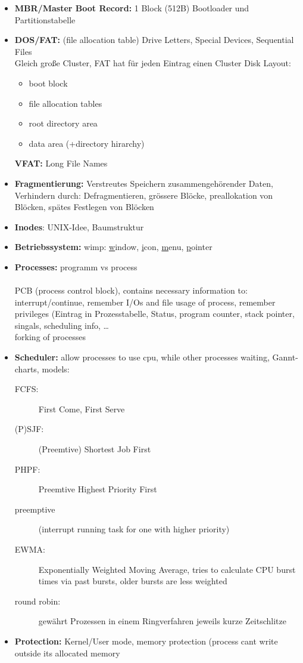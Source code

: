 \begin{itemize}
  \item \textbf{MBR/Master Boot Record:} 1 Block (512B) Bootloader und Partitionstabelle
  \item \textbf{DOS/FAT:} (file allocation table) Drive Letters, Special Devices, Sequential Files \\
  Gleich große Cluster, FAT hat für jeden Eintrag einen Cluster
  Disk Layout:
  \begin{itemize}
  \item boot block
  \item file allocation tables
  \item root directory area
  \item data area (+directory hirarchy)
  \end{itemize}
 \textbf{VFAT:} Long File Names
 \item \textbf{Fragmentierung:} Verstreutes Speichern zusammengehörender Daten, Verhindern durch: Defragmentieren, grössere Blöcke, preallokation von Blöcken, spätes Festlegen von Blöcken
 \item \textbf{Inodes}: UNIX-Idee, Baumstruktur
 \item \textbf{Betriebssystem:} wimp: \underline{w}indow, \underline{i}con, \underline{m}enu, \underline{p}ointer
 \item \textbf{Processes:} programm vs process \\
  \\
 PCB (process control block), contains necessary information to: interrupt/continue, remember I/Os and file usage of process, remember privileges (Eintrag in Prozesstabelle, Status, program counter, stack pointer, singals, scheduling info, \dots\\
 forking of processes
 \item \textbf{Scheduler:} allow processes to use cpu, while other processes waiting, Gannt-charts, models:
  \begin{description}
  \item[FCFS:] First Come, First Serve
  \item[(P)SJF:] (Preemtive) Shortest Job First
  \item[PHPF:] Preemtive Highest Priority First
  \item[preemptive] (interrupt running task for one with higher priority)
  \item[EWMA:] Exponentially Weighted Moving Average, tries to calculate CPU burst times via past bursts, older bursts are less weighted
  \item[round robin:] gewährt Prozessen in einem Ringverfahren jeweils kurze Zeitschlitze
  \end{description}
  \item \textbf{Protection:} Kernel/User mode, memory protection (process cant write outside its allocated memory
 \end{itemize}
 
